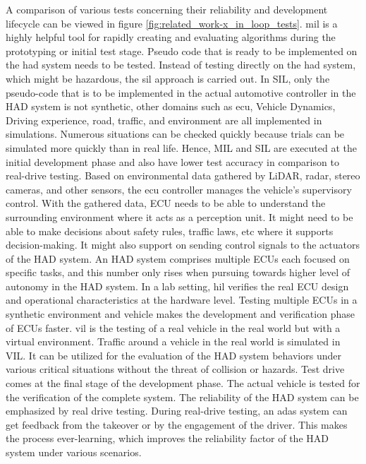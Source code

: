 A comparison of various tests concerning their reliability and development lifecycle can be viewed in figure \ref{fig:related_work-x_in_loop_tests}. \acrfull{mil} is a highly helpful tool for rapidly creating and evaluating algorithms during the prototyping or initial test stage. Pseudo code that is ready to be implemented on the \acrshort{had} system needs to be tested. Instead of testing directly on the \acrshort{had} system, which might be hazardous, the \acrfull{sil} approach is carried out. In SIL, only the pseudo-code that is to be implemented in the actual automotive controller in the HAD system is not synthetic, other domains such as \acrfull{ecu}, Vehicle Dynamics, Driving experience, road, traffic, and environment are all implemented in simulations. Numerous situations can be checked quickly because trials can be simulated more quickly than in real life. Hence, MIL and SIL are executed at the initial development phase and also have lower test accuracy in comparison to real-drive testing. Based on environmental data gathered by LiDAR, radar, stereo cameras, and other sensors, the \acrfull{ecu} controller manages the vehicle's supervisory control. With the gathered data, ECU needs to be able to understand the surrounding environment where it acts as a perception unit. It might need to be able to make decisions about safety rules, traffic laws, etc where it supports decision-making. It might also support on sending control signals to the actuators of the HAD system. An HAD system comprises multiple ECUs each focused on specific tasks, and this number only rises when pursuing towards higher level of autonomy in the HAD system. In a lab setting, \acrfull{hil} verifies the real ECU design and operational characteristics at the hardware level. Testing multiple ECUs in a synthetic environment and vehicle makes the development and verification phase of ECUs faster. \acrfull{vil} is the testing of a real vehicle in the real world but with a virtual environment. Traffic around a vehicle in the real world is simulated in VIL. It can be utilized for the evaluation of the HAD system behaviors under various critical situations without the threat of collision or hazards. Test drive comes at the final stage of the development phase. The actual vehicle is tested for the verification of the complete system. The reliability of the HAD system can be emphasized by real drive testing. During real-drive testing, an \acrfull{adas} system can get feedback from the takeover or by the engagement of the driver. This makes the process ever-learning, which improves the reliability factor of the HAD system under various scenarios.

